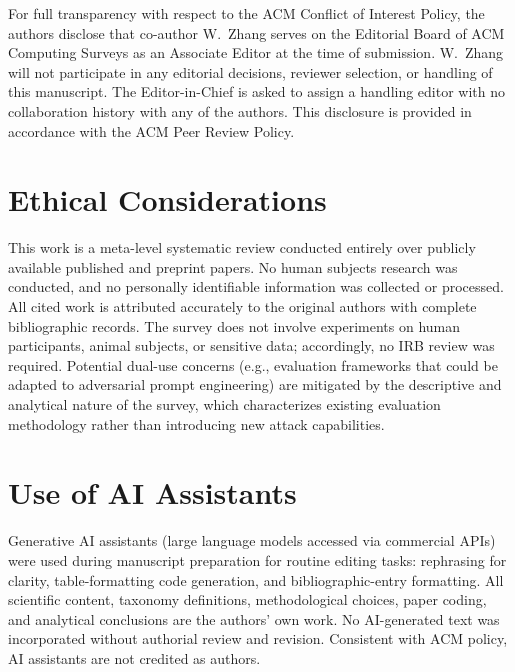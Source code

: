 \documentclass[acmsmall, nonacm, screen]{acmart}
\begin{document}
For full transparency with respect to the ACM Conflict of Interest
Policy, the authors disclose that co-author W.\ Zhang serves on the
Editorial Board of ACM Computing Surveys as an Associate Editor at
the time of submission. W.\ Zhang will not participate in any
editorial decisions, reviewer selection, or handling of this
manuscript. The Editor-in-Chief is asked to assign a handling editor
with no collaboration history with any of the authors. This
disclosure is provided in accordance with the ACM Peer Review Policy.

\section*{Ethical Considerations}
\label{sec:ethics}
This work is a meta-level systematic review conducted entirely over
publicly available published and preprint papers. No human subjects
research was conducted, and no personally identifiable information
was collected or processed. All cited work is attributed accurately
to the original authors with complete bibliographic records. The
survey does not involve experiments on human participants, animal
subjects, or sensitive data; accordingly, no IRB review was
required. Potential dual-use concerns (e.g., evaluation frameworks
that could be adapted to adversarial prompt engineering) are
mitigated by the descriptive and analytical nature of the survey,
which characterizes existing evaluation methodology rather than
introducing new attack capabilities.

\section*{Use of AI Assistants}
\label{sec:aiuse}
Generative AI assistants (large language models accessed via
commercial APIs) were used during manuscript preparation for routine
editing tasks: rephrasing for clarity, table-formatting code
generation, and bibliographic-entry formatting. All scientific
content, taxonomy definitions, methodological choices, paper coding,
and analytical conclusions are the authors' own work. No
AI-generated text was incorporated without authorial review and
revision. Consistent with ACM policy, AI assistants are not credited
as authors.


\FloatBarrier


\end{document}
